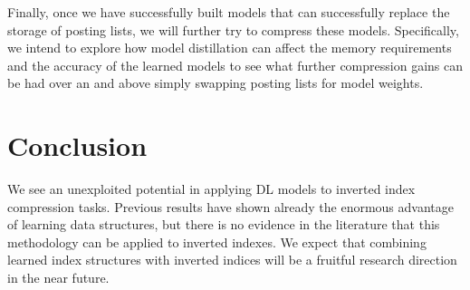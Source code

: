 \documentclass{article}
\begin{document}
Finally, once we have successfully built models that can successfully replace the storage of posting lists, we will further try to compress these models.
Specifically, we intend to explore how model distillation can affect the memory requirements and the accuracy of the learned models  to see what further compression gains can be had over an and above simply swapping posting lists for model weights.

\section{Conclusion}
We see an unexploited potential in applying DL models to inverted index compression tasks.
Previous results have shown already the enormous advantage of learning data structures, but there is no evidence in the literature that this methodology can be applied to inverted indexes. 
We expect that combining learned index structures with inverted indices will be a fruitful research direction in the near future.

 

\end{document}
